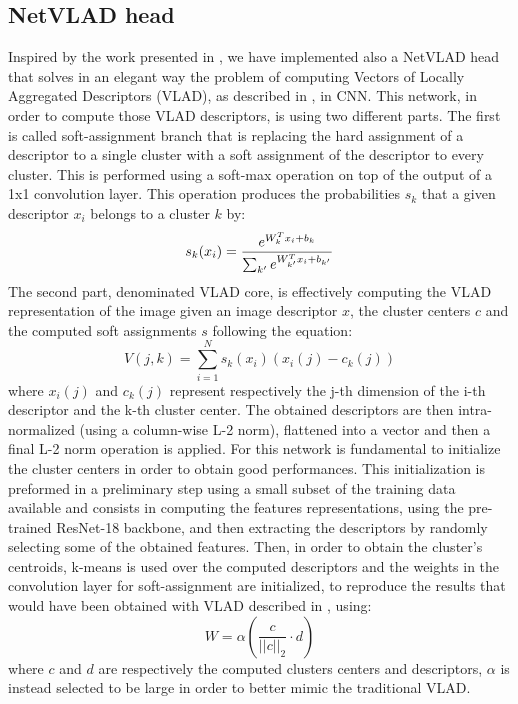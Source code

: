 \documentclass[10pt,twocolumn,letterpaper]{article}
\begin{document}
\subsection{NetVLAD head}\label{sec:NETVLAD}
Inspired by the work presented in \cite{NETVLAD}, we have implemented also a NetVLAD head that solves in an 
elegant way the problem of computing Vectors of Locally Aggregated Descriptors (VLAD), as described in \cite{VLAD},
in CNN. This network, in order to compute those VLAD descriptors, is using two different parts. 
The first is called soft-assignment branch that is replacing the hard assignment of a descriptor to a single cluster
with a soft assignment of the descriptor to every cluster. This is performed using a soft-max operation on top of the output of a 1x1
convolution layer. This operation produces the probabilities $s_k$ that a given descriptor $x_i$ belongs to a cluster $k$ by:
\begin{equation}
	s_k(x_i) = {{e^{W_k^T x_i+b_k}}\over{\sum_{k'} e^{W_{k'}^T x_i+b_{k'}}}}
\end{equation} 
The second part, denominated VLAD core, is effectively computing the 
VLAD representation of the image given an image descriptor $x$, the cluster centers $c$ and the computed soft assignments
$s$ following the equation:
\begin{equation}
	V(j,k) = \sum_{i=1}^N s_k(x_i) (x_i(j) - c_k(j))
\end{equation} 
where $x_i(j)$ and $c_k(j)$ represent respectively the j-th dimension of the i-th descriptor and the k-th cluster center.
The obtained descriptors are then intra-normalized (using a column-wise L-2 norm), flattened into a vector and then a
final L-2 norm operation is applied.
For this network is fundamental to initialize the cluster centers in order to obtain good performances. This initialization
is preformed in a preliminary step using a small subset of the training data available and consists in computing the features 
representations, using the pre-trained ResNet-18 backbone, and then extracting the descriptors by randomly selecting some of the 
obtained features. Then, in order to obtain the cluster's centroids, k-means is used over the computed descriptors and the 
weights in the convolution layer for soft-assignment are initialized, to reproduce the results that would have been obtained
with VLAD described in \cite{VLAD}, using:
\begin{equation}
   W = \alpha ({\frac{c}{{||c||}_2}} \cdot d )
\end{equation}
where $c$ and $d$ are respectively the computed clusters centers and descriptors, $\alpha$ is instead selected to be large
in order to better mimic the traditional VLAD.
\end{document}
